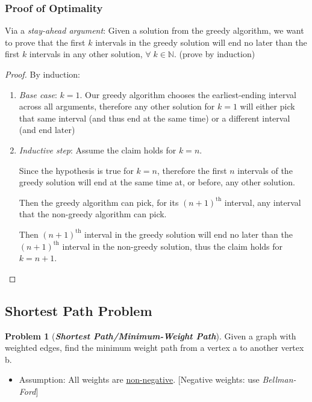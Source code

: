 \documentclass[12pt]{extarticle}
\theoremstyle{definition}
\newtheorem*{problem}{Problem}
\theoremstyle{remark}
\newcommand{\probname}[1]{\noindent \textbf{\textit{#1}}}
\begin{document}
\subsubsection*{Proof of Optimality}
Via a \textit{stay-ahead argument}: Given a solution from the greedy algorithm, we want to prove that the first $k$ intervals in the greedy solution will end no later than the first $k$ intervals in any other solution, $\forall\;k\in\mathbb{N}$. (prove by induction)
\begin{proof}
    By induction: \begin{enumerate}
        \item \textit{Base case}: $k=1$. Our greedy algorithm chooses the earliest-ending interval across all arguments, therefore any other solution for $k=1$ will either pick that same interval (and thus end at the same time) or a different interval (and end later)
        \item \textit{Inductive step}: Assume the claim holds for $k=n$.
        
        Since the hypothesis is true for $k=n$, therefore the first $n$ intervals of the greedy solution will end at the same time at, or before, any other solution. 
        
        Then the greedy algorithm can pick, for its $(n+1)^{\text{th}}$ interval, any interval that the non-greedy algorithm can pick.
        
        Then $(n+1)^{\text{th}}$ interval in the greedy solution will end no later than the $(n+1)^{\text{th}}$ interval in the non-greedy solution, thus the claim holds for $k=n+1$.
    \end{enumerate}
\end{proof}

\pagebreak
\subsection{Shortest Path Problem}
\begin{problem}[\probname{Shortest Path/Minimum-Weight Path}]
    Given a graph with weighted edges, find the minimum weight path from a vertex a to another vertex b.\begin{itemize}
        \item Assumption: All weights are \ul{non-negative}. [Negative weights: use \textit{Bellman-Ford}]
    \end{itemize}
\end{problem}
\end{document}

